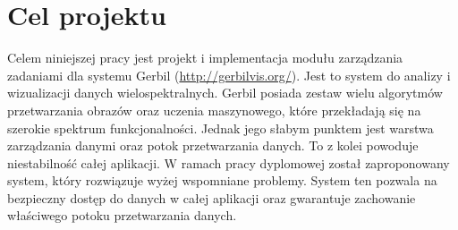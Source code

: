 
\chapter{Cel projektu}

Celem niniejszej pracy jest projekt i implementacja modułu zarządzania zadaniami dla systemu Gerbil (\url{http://gerbilvis.org/}). Jest to system do analizy i wizualizacji danych wielospektralnych. Gerbil posiada zestaw wielu algorytmów przetwarzania obrazów oraz uczenia maszynowego, które przekładają się na szerokie spektrum funkcjonalności. Jednak jego słabym punktem jest warstwa zarządzania danymi oraz potok przetwarzania danych. To z kolei powoduje niestabilność całej aplikacji. W ramach pracy dyplomowej został zaproponowany system, który rozwiązuje wyżej wspomniane problemy. System ten pozwala na bezpieczny dostęp do danych w całej aplikacji oraz gwarantuje zachowanie właściwego potoku przetwarzania danych. 
